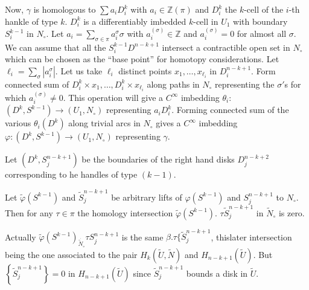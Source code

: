 Now, $\gamma$ is homologous to $\sum a_i D^k _i$ with $a_i \in
\mathbb{Z}(\pi)$ and $D^k _i$ the $k$-cell of the $i$-th hankle of
type $k$. $D^k _i$ is a differentiably imbedded $k$-cell in $U_1$ with
boundary $S_i^{ k-1}$ in $N_\circ$. Let $a_i= \sum\limits_{\sigma \in
  \pi} a_i^ \sigma \sigma$ with $ a_i^{(\sigma)}\in \mathbb{Z}$ and
$a_i^{(\sigma)}=0$ for almost all $\sigma$. We can assume that all the
$S_i^{k-1} D^{n-k+1}$ intersect a contractible open set in $N_\circ$ which
can be chosen as the ``base point'' for homotopy considerations. Let
$\ell_i= \sum\limits_{\sigma} | a_i^ \sigma |$. Let us take $\ell_i$
distinct points $x_1, \ldots,x_{\ell_i}$ in $D_i^{n-k+1}$. Form connected sum
of $D_i^k \times x_1, \ldots, D_i^k \times x_{\ell_i}$ along paths in
$N_\circ$ representing the $\sigma'$s for which $a_i^{(\sigma)} \neq
0$. This operation will give a $C^\infty$ imbedding $\theta_i$: $(D^k,
S^{k-1}) \to (U_1, N_\circ)$ representing $a_i D^k_i$. Forming connected
sum of the various $\theta_i (D^k)$ along trivial arcs in $N_\circ$ gives
a $C^\infty$ imbedding $\varphi: (D^k, S^{k-1}) \to (U_1, N_\circ)$
representing $\gamma$.  

Let $(D^k, S^{n-k+1}_j)$ be the boundaries of the right hand disks $D_j
^{n- k+2}$ corresponding to he handles of type $(k-1)$.  

\medskip
{}
 Let $\tilde{\varphi}(S^{k-1})$ and
$\tilde{S}^{n-k+1}_j$ be arbitrary lifts of $\varphi (S^{k-1})$ and
$S_j ^{n-k+1}$ to $N_\circ$. Then for any $\tau \in \pi$ the
homology intersection $\tilde{\varphi}(S^{k-1})$. $\tau
\tilde{S}^{n-k+1}_j$ in $\tilde{N}_\circ$ is zero. 
 
Actually $\tilde{\varphi} (S^{k-1})_{\dot{\tilde{N}_\circ}} \tau S_j^{n-k+1}$
is the same $\beta . \tau \{\tilde{S}_j^{n-k+1}$, this\pageoriginale later
intersection being the one associated to the pair $H_k (\tilde{U},
\tilde{N})$ and 
$H_{n-k+1} (\tilde{U})$. But $\left\{\tilde{S}^{n-k+1}_j\right \} = 0$
in $H_{n-k+1} (\tilde{U})$ since $\tilde{S}^{n-k+1}_j$ bounds a disk
in $\tilde{U}$.  

